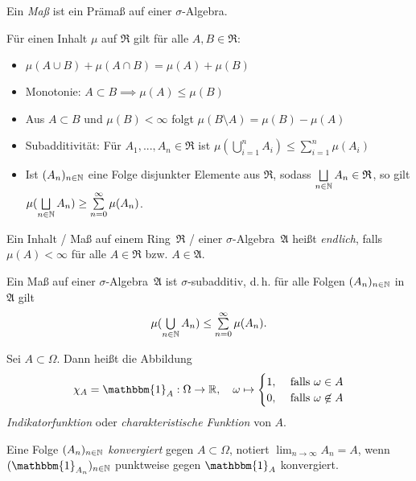 \documentclass{cheat-sheet}
\newcommand{\Alg}{\mathfrak{A}} %
\newcommand{\Ring}{\mathfrak{R}} %
\newcommand{\ind}{\mathbbm{1}} %
\begin{document}
\begin{defn}
  Ein \emph{Maß} ist ein Prämaß auf einer $\sigma$-Algebra.
\end{defn}

\begin{satz}
  Für einen Inhalt $\mu$ auf $\Ring$ gilt für alle $A, B \in \Ring$:
  \begin{itemize}
    \item $\mu(A \cup B) + \mu(A \cap B) = \mu(A) + \mu(B)$
    \item Monotonie: $A \subset B \implies \mu(A) \leq \mu(B)$
    \item Aus $A \subset B$ und $\mu(B) < \infty$ folgt $\mu(B \setminus A) = \mu(B) - \mu(A)$
    \item Subadditivität: Für $A_1, ..., A_n \in \Ring$ ist $\mu\left(\bigcup_{i = 1}^n A_i \right) \leq \sum_{i = 1}^n \mu(A_i)$
    \item Ist $(A_n)_{n \in \mathbb{N}}$ eine Folge disjunkter Elemente aus $\Ring$, sodass $\bigsqcup_{n \in \N} A_n \in \Ring$, so gilt $\mu(\bigsqcup_{n \in \N} A_n) \geq \sum_{n=0}^\infty \mu(A_n)$.
  \end{itemize}
\end{satz}

\begin{defn}
  Ein Inhalt / Maß auf einem Ring~$\Ring$ / einer $\sigma$-Algebra~$\Alg$ heißt \emph{endlich}, falls $\mu(A) < \infty$ für alle $A \in \Ring$ bzw. $A \in \Alg$.
\end{defn}

\begin{satz}
  Ein Maß auf einer $\sigma$-Algebra~$\Alg$ ist $\sigma$-subadditiv, d.\,h. für alle Folgen $(A_n)_{n \in \mathbb{N}}$ in $\Alg$ gilt
  \[ \mu(\bigcup_{n \in \N} A_n) \leq \sum_{n=0}^\infty \mu(A_n). \]
\end{satz}

\begin{defn}
  Sei $A \subset \Omega$. Dann heißt die Abbildung
  \[ \chi_A = \ind_A : \Omega \to \R, \quad \omega \mapsto \begin{cases} 1, & \text{ falls } \omega \in A \\ 0, & \text{ falls } \omega \not\in A \end{cases} \]
  \emph{Indikatorfunktion} oder \emph{charakteristische Funktion} von $A$.
\end{defn}

\begin{defn}
  Eine Folge $(A_n)_{n \in \mathbb{N}}$ \emph{konvergiert} gegen $A \subset \Omega$, notiert $\lim_{n \to \infty} A_n = A$, wenn $(\ind_{A_n})_{n \in \N}$ punktweise gegen $\ind_A$ konvergiert.
\end{defn}
\end{document}
